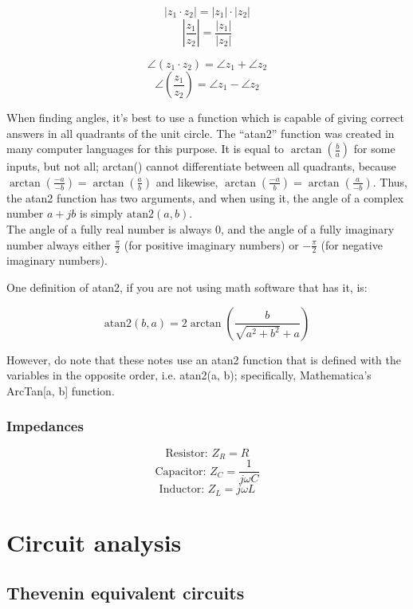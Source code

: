 \documentclass[12pt,a4paper]{report}
\begin{document}
\[ |z_1 \cdot z_2| = |z_1| \cdot |z_2| \]
\[ \left| \frac{z_1}{z_2} \right| = \frac{|z_1|}{|z_2|} \]

\[ \angle (z_1 \cdot z_2) = \angle z_1 + \angle z_2 \]
\[ \angle \left( \frac{z_1}{z_2} \right) = \angle z_1 - \angle z_2 \]

When finding angles, it's best to use a function which is capable of giving correct answers in all quadrants of the unit circle. The ``atan2'' function was created in many computer languages for this purpose. It is equal to $\displaystyle \arctan{(\frac{b}{a})}$ for some inputs, but not all; arctan() cannot differentiate between all quadrants, because $\displaystyle \arctan{\left( \frac{-a}{-b}\right )} = \arctan{\left( \frac{a}{b}\right) }$ and likewise, $\displaystyle \arctan{\left( \frac{-a}{b}\right )} = \arctan{\left( \frac{a}{-b}\right) }$. Thus, the atan2 function has two arguments, and when using it, the angle of a complex number $a + jb$ is simply $\text{atan2}(a, b)$.\\
The angle of a fully real number is always $0$, and the angle of a fully imaginary number always either $\displaystyle \frac{\pi}{2}$ (for positive imaginary numbers) or $\displaystyle -\frac{\pi}{2}$ (for negative imaginary numbers).

One definition of atan2, if you are not using math software that has it, is:

\[ \text{atan2}(b, a) = 2\arctan{(\frac{b}{\sqrt{a^2 + b^2} + a})} \]

However, do note that these notes use an atan2 function that is defined with the variables in the opposite order, i.e. atan2(a, b); specifically, Mathematica's ArcTan[a, b] function.


\subsection{Impedances}

\[ \text{Resistor: } Z_R = R \]
\[ \text{Capacitor: } Z_C = \frac{1}{j\omega C} \]
\[ \text{Inductor: } Z_L = j\omega L \]


\chapter{Circuit analysis}

\section{Thevenin equivalent circuits}
\end{document}
